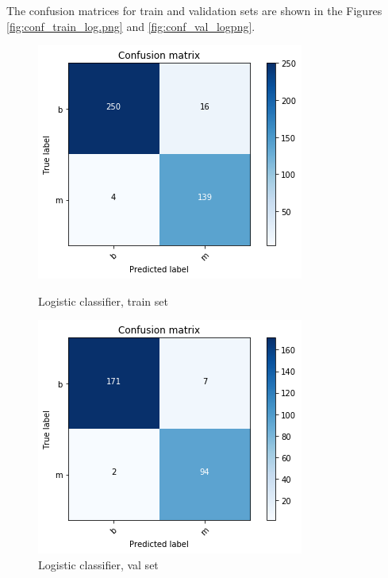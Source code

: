 \documentclass[11pt,a4paper]{article}
\begin{document}
The confusion matrices for train and validation sets are shown in the Figures \ref{fig:conf_train_log.png} and \ref{fig:conf_val_logpng}.

\begin{figure}[H]\centering
	\begin{minipage}{0.49\linewidth}
		\includegraphics[width=\linewidth]{figures/conf_train_all.png}
		\caption{Logistic classifier, train set}\label{fig:conf_train_log.png}
	\end{minipage}
	\begin{minipage}{0.49\linewidth}
		\includegraphics[width=\linewidth]{figures/conf_val_all.png}
		\caption{Logistic classifier, val set}\label{fig:conf_val_log.png}
	\end{minipage}
\end{figure}	
\end{document}
